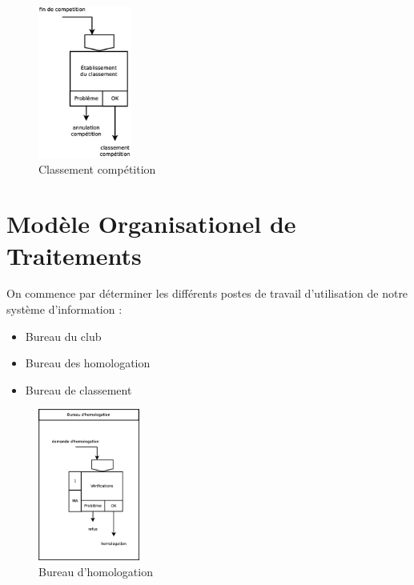 \begin{figure}[!htb]
    \begin{center}
    \includegraphics[height=5cm]{images/cc2_mct4.eps}
    \caption{\label{cc2_mct4} Classement compétition}
    \end{center}
\end{figure}

\newpage
\section*{Modèle Organisationel de Traitements}

On commence par déterminer les différents postes de travail d'utilisation de notre système d'information :\\

\begin{itemize}
    \item Bureau du club
    \item Bureau des homologation
    \item Bureau de classement
\end{itemize}

\begin{figure}[!htb]
    \begin{center}
    \includegraphics[height=5cm]{images/cc2_mot1.eps}
    \caption{\label{cc2_mot1} Bureau d'homologation}
    \end{center}
\end{figure}

